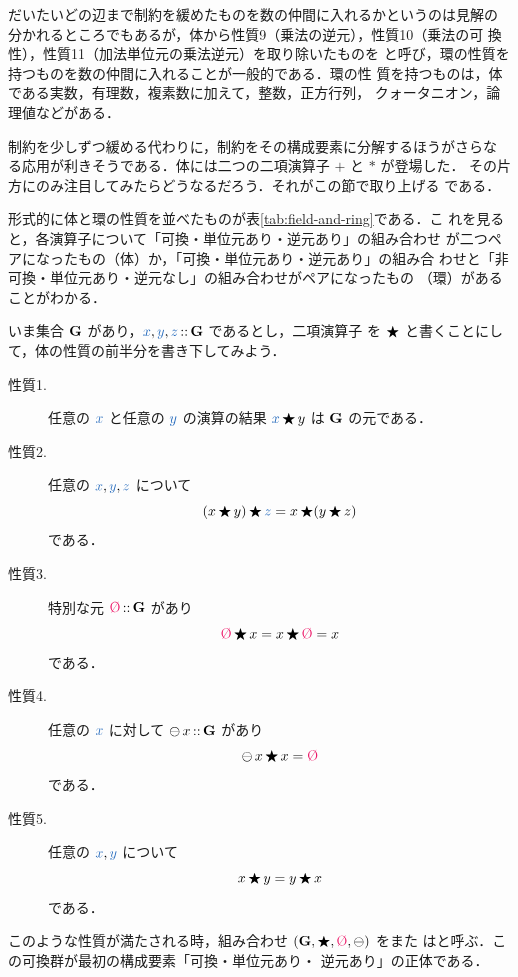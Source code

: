 \documentclass[a5paper,twoside,fleqn,draft]{jsbook}
\begin{document}
だいたいどの辺まで制約を緩めたものを数の仲間に入れるかというのは見解の
分かれるところでもあるが，体から性質9（乗法の逆元），性質10（乗法の可
換性），性質11（加法単位元の乗法逆元）を取り除いたものを
と呼び，環の性質を持つものを数の仲間に入れることが一般的である．環の性
質を持つものは，体である実数，有理数，複素数に加えて，整数，正方行列，
クォータニオン，論理値などがある．

制約を少しずつ緩める代わりに，制約をその構成要素に分解するほうがさらな
る応用が利きそうである．体には二つの二項演算子 $+$ と $*$ が登場した．
その片方にのみ注目してみたらどうなるだろう．それがこの節で取り上げる
である．

形式的に体と環の性質を並べたものが表\ref{tab:field-and-ring}である．こ
れを見ると，各演算子について「可換・単位元あり・逆元あり」の組み合わせ
が二つペアになったもの（体）か，「可換・単位元あり・逆元あり」の組み合
わせと「非可換・単位元あり・逆元なし」の組み合わせがペアになったもの
（環）があることがわかる．

いま集合 $\mathbf{G}$ があり，$\hVar{x},\hVar{y},\hVar{z}\mIn\mSet{G}$ であるとし，二項演算子
を $\operatorname{\bigstar}$ と書くことにして，体の性質の前半分を書き下してみよう．
\begin{description}
\item[性質1.] 任意の $\hVar{x}$ と任意の $\hVar{y}$ の演算の結果 $\hVar{x}\hAnyBinOp y$ は
$\mathbf{G}$ の元である．
\item[性質2.] 任意の $\hVar{x},\hVar{y},\hVar{z}$ について
\begin{equation}
(x\hAnyBinOp y)\hAnyBinOp \hVar{z}=x\hAnyBinOp(y\hAnyBinOp z)
\end{equation}
である．
\item[性質3.] 特別な元 $\mZero\mIn\mSet{G}$ があり
\begin{equation}
\mZero\hAnyBinOp x=x\hAnyBinOp\mZero=x
\end{equation}
である．
\item[性質4.] 任意の $\hVar{x}$ に対して $\operatorname{\ominus} x\operatorname{{:\!:}}\mathbf{G}$ があり
\begin{equation}
\mMinus x\hAnyBinOp x=\mZero
\end{equation}
である．
\item[性質5.] 任意の $\hVar{x},\hVar{y}$ について
\begin{equation}
x\operatorname{\bigstar} y=y\operatorname{\bigstar} x
\end{equation}
である．
\end{description}
このような性質が満たされる時，組み合わせ
$\mTupleWith{\mSet{G},\hAnyBinOp,\mZero,\mMinus}$ をまた
はと呼ぶ．この可換群が最初の構成要素「可換・単位元あり・
逆元あり」の正体である．
\end{document}
